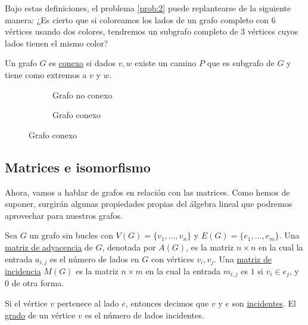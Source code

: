 Bajo estas definiciones, el problema \ref{prob:2} puede replantearse de la siguiente manera: ¿Es cierto que si coloreamos los lados de un grafo completo con $6$ vértices usando dos colores, tendremos un subgrafo completo de $3$ vértices cuyos lados tienen el mismo color?

\begin{defn}
    Un grafo $G$ es \ul{conexo} si dados $v, w$ existe un camino $P$ que es subgrafo de $G$ y tiene como extremos a $v$ y $w$.
\end{defn}

\begin{figure}
    \begin{subfigure}[b]{0.5\textwidth}
    \centering
        \caption{Grafo no conexo}
    \end{subfigure}
    \hfill
    \begin{subfigure}[b]{0.5\textwidth}
    \centering
        \caption{Grafo conexo}
    \end{subfigure}
\end{figure}

\subsection{Matrices e isomorfismo}

Ahora, vamos a hablar de grafos en relación con las matrices. Como hemos de suponer, surgirán algunas propiedades propias del álgebra lineal que podremos aprovechar para nuestros grafos.

\begin{defn}
    Sea $G$ un grafo sin bucles con $V(G) = \{v_1, \dots, v_n\}$ y $E(G) = \{e_1, \dots, e_m\}$. Una \ul{matriz de adyacencia} de $G$, denotada por $A(G)$, es la matriz $n \times n$ en la cual la entrada $a_{i,j}$ es el número de lados en $G$ con vértices $v_i,v_j$. Una \ul{matriz de incidencia} $M(G)$ es la matriz $n \times m$ en la cual la entrada $m_{i,j}$ es $1$ si $v_i \in e_j$, y $0$ de otra forma.
    
    Si el vértice $v$ pertenece al lado $e$, entonces decimos que $v$ y $e$ son \ul{incidentes}. El \ul{grado} de un vértice $v$ es el número de lados incidentes.
\end{defn}

